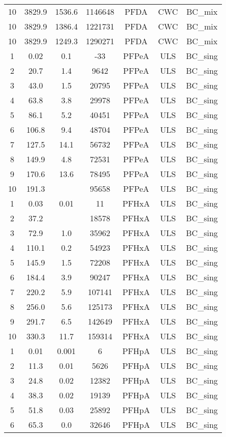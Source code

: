 \begin{longtable}[c]{ccccccc}
10 & 3829.9 & 1536.6 & 1146648 & PFDA & CWC & BC\_mix \\
10 & 3829.9 & 1386.4 & 1221731 & PFDA & CWC & BC\_mix \\
10 & 3829.9 & 1249.3 & 1290271 & PFDA & CWC & BC\_mix \\
1 & 0.02 & 0.1 & -33 & PFPeA & ULS & BC\_sing \\
2 & 20.7 & 1.4 & 9642 & PFPeA & ULS & BC\_sing \\
3 & 43.0 & 1.5 & 20795 & PFPeA & ULS & BC\_sing \\
4 & 63.8 & 3.8 & 29978 & PFPeA & ULS & BC\_sing \\
5 & 86.1 & 5.2 & 40451 & PFPeA & ULS & BC\_sing \\
6 & 106.8 & 9.4 & 48704 & PFPeA & ULS & BC\_sing \\
7 & 127.5 & 14.1 & 56732 & PFPeA & ULS & BC\_sing \\
8 & 149.9 & 4.8 & 72531 & PFPeA & ULS & BC\_sing \\
9 & 170.6 & 13.6 & 78495 & PFPeA & ULS & BC\_sing \\
10 & 191.3 &  & 95658 & PFPeA & ULS & BC\_sing \\
1 & 0.03 & 0.01 & 11 & PFHxA & ULS & BC\_sing \\
2 & 37.2 &  & 18578 & PFHxA & ULS & BC\_sing \\
3 & 72.9 & 1.0 & 35962 & PFHxA & ULS & BC\_sing \\
4 & 110.1 & 0.2 & 54923 & PFHxA & ULS & BC\_sing \\
5 & 145.9 & 1.5 & 72208 & PFHxA & ULS & BC\_sing \\
6 & 184.4 & 3.9 & 90247 & PFHxA & ULS & BC\_sing \\
7 & 220.2 & 5.9 & 107141 & PFHxA & ULS & BC\_sing \\
8 & 256.0 & 5.6 & 125173 & PFHxA & ULS & BC\_sing \\
9 & 291.7 & 6.5 & 142649 & PFHxA & ULS & BC\_sing \\
10 & 330.3 & 11.7 & 159314 & PFHxA & ULS & BC\_sing \\
1 & 0.01 & 0.001 & 6 & PFHpA & ULS & BC\_sing \\
2 & 11.3 & 0.01 & 5626 & PFHpA & ULS & BC\_sing \\
3 & 24.8 & 0.02 & 12382 & PFHpA & ULS & BC\_sing \\
4 & 38.3 & 0.02 & 19139 & PFHpA & ULS & BC\_sing \\
5 & 51.8 & 0.03 & 25892 & PFHpA & ULS & BC\_sing \\
6 & 65.3 & 0.0 & 32646 & PFHpA & ULS & BC\_sing \\

\end{longtable}
